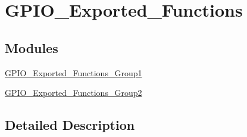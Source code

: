 \hypertarget{group___g_p_i_o___exported___functions}{}\section{G\+P\+I\+O\+\_\+\+Exported\+\_\+\+Functions}
\label{group___g_p_i_o___exported___functions}
\subsection*{Modules}
\begin{DoxyCompactItemize}
\item 
\mbox{\hyperlink{group___g_p_i_o___exported___functions___group1}{G\+P\+I\+O\+\_\+\+Exported\+\_\+\+Functions\+\_\+\+Group1}}
\item 
\mbox{\hyperlink{group___g_p_i_o___exported___functions___group2}{G\+P\+I\+O\+\_\+\+Exported\+\_\+\+Functions\+\_\+\+Group2}}
\end{DoxyCompactItemize}


\subsection{Detailed Description}
